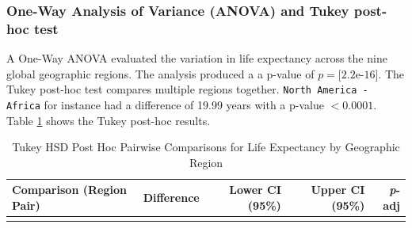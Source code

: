 \documentclass[3pt, a4paper]{article}
\begin{document}
\subsubsection{One-Way Analysis of Variance (ANOVA) and Tukey post-hoc test}
A One-Way ANOVA evaluated the variation in life expectancy across the nine global geographic regions. The analysis produced a a p-value of $p = \text{[2.2e-16]}$. The Tukey post-hoc test compares multiple regions together.  \texttt{North America - Africa} for instance had a difference of 19.99 years with a p-value $< 0.0001$. Table \ref{tab:tukey_region} shows the Tukey post-hoc results.

\begin{small} 
\begin{longtable}{>{\raggedright\arraybackslash}p{5.2cm}rrrr}
\caption{Tukey HSD Post Hoc Pairwise Comparisons for Life Expectancy by Geographic Region} \label{tab:tukey_region} \\
\toprule
\textbf{Comparison (Region Pair)} & \textbf{Difference} & \textbf{Lower CI (95\%)} & \textbf{Upper CI (95\%)} & \textbf{\textit{p}-adj} \\
\midrule
\endhead

\bottomrule
\endfoot


\end{longtable}
\end{small}
\end{document}
